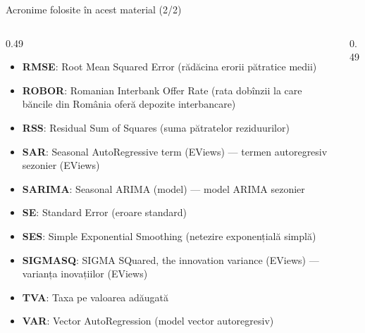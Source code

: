 \begin{frame}{Acronime folosite în acest material (2/2)}
\begin{columns}[T]
\begin{column}{0.49\textwidth}
\begin{itemize}\setlength{\itemsep}{0pt}
    \item \textbf{RMSE}: Root Mean Squared Error (rădăcina erorii pătratice medii)
    \item \textbf{ROBOR}: Romanian Interbank Offer Rate (rata dobînzii la care băncile din România oferă depozite interbancare)
    \item \textbf{RSS}: Residual Sum of Squares (suma pătratelor reziduurilor)
    \item \textbf{SAR}: Seasonal AutoRegressive term (EViews) — termen autoregresiv sezonier (EViews)
    \item \textbf{SARIMA}: Seasonal ARIMA (model) — model ARIMA sezonier
    \item \textbf{SE}: Standard Error (eroare standard)
    \item \textbf{SES}: Simple Exponential Smoothing (netezire exponențială simplă)
    \item \textbf{SIGMASQ}: SIGMA SQuared, the innovation variance (EViews) — varianța inovațiilor (EViews)
    \item \textbf{TVA}: Taxa pe valoarea adăugată
    \item \textbf{VAR}: Vector AutoRegression (model vector autoregresiv)
\end{itemize}
\end{column}
\begin{column}{0.49\textwidth}
\end{column}
\end{columns}
\end{frame}

